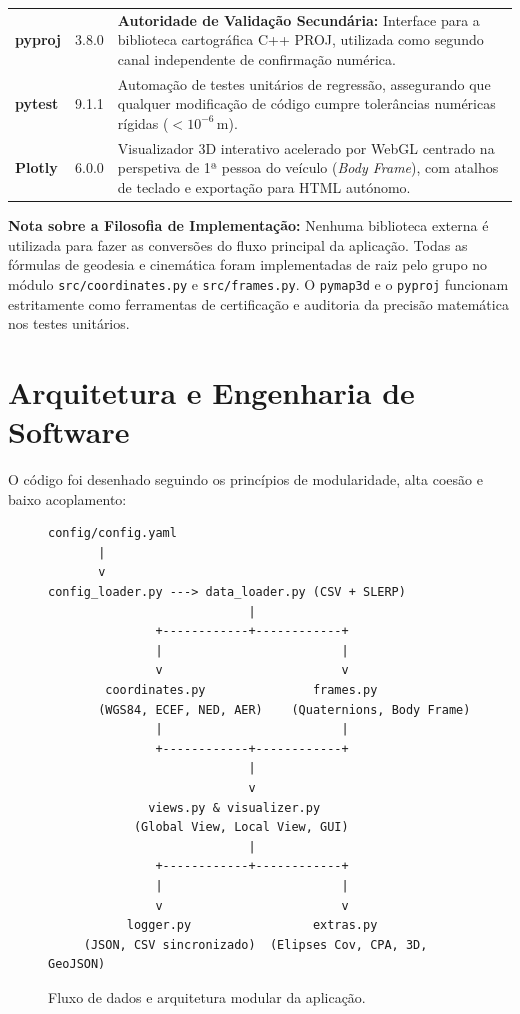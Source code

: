 \documentclass[11pt,a4paper]{article}
\begin{document}
\begin{table}[H]
\begin{tabular}{@{}llp{8.5cm}@{}}
\addlinespace
\textbf{pyproj} & 3.8.0 & \textbf{Autoridade de Validação Secundária:} Interface para a biblioteca cartográfica C++ PROJ, utilizada como segundo canal independente de confirmação numérica. \\
\addlinespace
\textbf{pytest} & 9.1.1 & Automação de testes unitários de regressão, assegurando que qualquer modificação de código cumpre tolerâncias numéricas rígidas ($< 10^{-6}\,\text{m}$). \\
\addlinespace
\textbf{Plotly} & 6.0.0 & Visualizador 3D interativo acelerado por WebGL centrado na perspetiva de 1ª pessoa do veículo (\textit{Body Frame}), com atalhos de teclado e exportação para HTML autónomo. \\
\bottomrule
\end{tabular}
\end{table}

\noindent\textbf{Nota sobre a Filosofia de Implementação:} Nenhuma biblioteca externa é utilizada para fazer as conversões do fluxo principal da aplicação. Todas as fórmulas de geodesia e cinemática foram implementadas de raiz pelo grupo no módulo \texttt{src/coordinates.py} e \texttt{src/frames.py}. O \texttt{pymap3d} e o \texttt{pyproj} funcionam estritamente como ferramentas de certificação e auditoria da precisão matemática nos testes unitários.

\section{Arquitetura e Engenharia de Software}

O código foi desenhado seguindo os princípios de modularidade, alta coesão e baixo acoplamento:

\begin{figure}[H]
\centering
\begin{verbatim}
config/config.yaml
       |
       v
config_loader.py ---> data_loader.py (CSV + SLERP)
                            |
               +------------+------------+
               |                         |
               v                         v
        coordinates.py               frames.py
       (WGS84, ECEF, NED, AER)    (Quaternions, Body Frame)
               |                         |
               +------------+------------+
                            |
                            v
              views.py & visualizer.py
            (Global View, Local View, GUI)
                            |
               +------------+------------+
               |                         |
               v                         v
           logger.py                 extras.py
     (JSON, CSV sincronizado)  (Elipses Cov, CPA, 3D, GeoJSON)
\end{verbatim}
\caption{Fluxo de dados e arquitetura modular da aplicação.}
\label{fig:arquitetura}
\end{figure}
\end{document}
